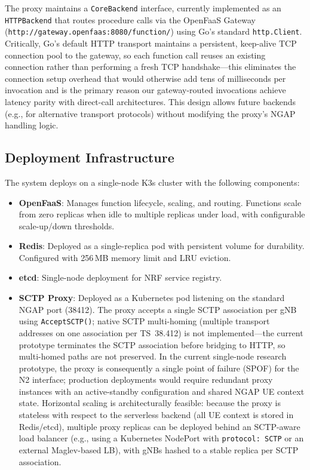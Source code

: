 \documentclass[conference]{IEEEtran}
\begin{document}
The proxy maintains a \texttt{CoreBackend} interface, currently implemented as an \texttt{HTTPBackend} that routes procedure calls via the OpenFaaS Gateway (\texttt{http://gateway.openfaas:8080/function/}) using Go's standard \texttt{http.Client}. Critically, Go's default HTTP transport maintains a persistent, keep-alive TCP connection pool to the gateway, so each function call reuses an existing connection rather than performing a fresh TCP handshake---this eliminates the connection setup overhead that would otherwise add tens of milliseconds per invocation and is the primary reason our gateway-routed invocations achieve latency parity with direct-call architectures. This design allows future backends (e.g., for alternative transport protocols) without modifying the proxy's NGAP handling logic.

\subsection{Deployment Infrastructure}

The system deploys on a single-node K3s cluster with the following components:
\begin{itemize}
    \item \textbf{OpenFaaS}: Manages function lifecycle, scaling, and routing. Functions scale from zero replicas when idle to multiple replicas under load, with configurable scale-up/down thresholds.
    \item \textbf{Redis}: Deployed as a single-replica pod with persistent volume for durability. Configured with 256\,MB memory limit and LRU eviction.
    \item \textbf{etcd}: Single-node deployment for NRF service registry.
    \item \textbf{SCTP Proxy}: Deployed as a Kubernetes pod listening on the standard NGAP port (38412). The proxy accepts a single SCTP association per gNB using \texttt{AcceptSCTP()}; native SCTP multi-homing (multiple transport addresses on one association per TS~38.412) is not implemented---the current prototype terminates the SCTP association before bridging to HTTP, so multi-homed paths are not preserved. In the current single-node research prototype, the proxy is consequently a single point of failure (SPOF) for the N2 interface; production deployments would require redundant proxy instances with an active-standby configuration and shared NGAP UE context state. Horizontal scaling is architecturally feasible: because the proxy is stateless with respect to the serverless backend (all UE context is stored in Redis/etcd), multiple proxy replicas can be deployed behind an SCTP-aware load balancer (e.g., using a Kubernetes NodePort with \texttt{protocol: SCTP} or an external Maglev-based LB), with gNBs hashed to a stable replica per SCTP association.
\end{itemize}
\end{document}
